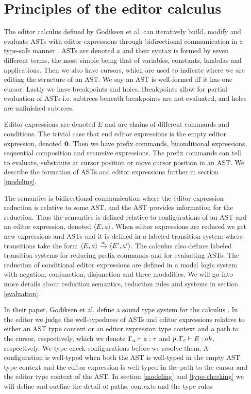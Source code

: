 \section{Principles of the editor calculus}
\label{principles}

The editor calculus defined by Godiksen et al. can iteratively build, modify
and evaluate ASTs with editor expressions through bidirectional communication in
a type-safe manner \pepm. ASTs are denoted $a$ and their syntax is formed by
seven different terms, the most simple being that of variables, constants,
lambdas and applications. Then we also have cursors, which are used to indicate
where we are editing the structure of an AST. We say an AST is well-formed iff
it has one cursor. Lastly we have breakpoints and holes. Breakpoints allow for
partial evaluation of ASTs i.e. subtrees beneath breakpoints are not evaluated,
and holes are unfinished subtrees.

Editor expressions are denoted $E$ and are chains of different commands and
conditions. The trivial case that end editor expressions is the empty editor
expression, denoted $\mathbf{0}$. Then we have prefix commands, biconditional
expressions, sequential composition and recursive expressions. The prefix
commands can tell to evaluate, substitute at cursor position or move cursor
position in an AST. We describe the formation of ASTs and editor expressions
further in section \ref{modeling}.

The semantics is bidirectional communication where the editor expression
reduction is relative to some AST, and the AST provides information for the
reduction. Thus the semantics is defined relative to configurations of an AST
and an editor expression, denoted $\langle E,a \rangle$. When editor expressions
are reduced we get new expressions and ASTs and it is defined in a labeled
transition system where transitions take the form $\langle E, a \rangle
\xrightarrow[]{\text{$\alpha$}} \langle E', a' \rangle$. The calculus also defines labeled
transition systems for reducing prefix commands and for evaluating ASTs. The
reduction of conditional editor expressions are defined in a modal logic system
with negation, conjunction, disjunction and three modalities. We will go into
more details about reduction semantics, reduction rules and systems in section
\ref{evaluation}.

In their paper, Godiksen et al. define a sound type system for the calculus
\pepm. In the editor we judge the well-typedness of ASTs and editor expressions
relative to either an AST type context or an editor expression type context and
a path to the cursor, respectively, which we denote $\Gamma_{a} \vdash
a : \tau$ and $p,\Gamma_{e} \vdash E : ok$, respectively. We type
check configurations before we resolve them. A configuration is well-typed when
both the AST is well-typed in the empty AST type context and the editor
expression is well-typed in the path to the cursor and the editor type context
of the AST. In section \ref{modeling} and \ref{type-checking} we will define
and outline the detail of paths, contexts and the type rules.
